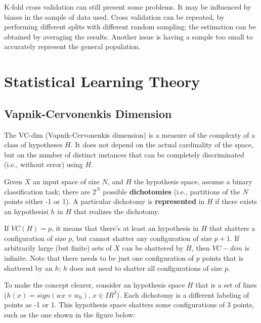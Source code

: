 K-fold cross validation can still present some problems. It may be influenced by biases in the sample of data used. Cross validation can be repeated, by performing different splits with different random sampling; the estimation can be obtained by averaging the results. Another issue is having a sample too small to accurately represent the general population.

\section{Statistical Learning Theory}

\subsection{Vapnik-Cervonenkis Dimension}

The VC-dim (Vapnik-Cervonenkis dimension) is a measure of the complexty of a class of hypotheses $H$. It does not depend on the actual cardinality of the space, but on the number of distinct instances that can be completely discriminated (i.e., without error) using $H$.

Given $X$ an input space of size $N$, and $H$ the hypothesis space, assume a binary classification task; there are $2^N$ possible \textbf{dichotomies} (i.e., partitions of the $N$ points either -1 or 1). A particular dichotomy is \textbf{represented} in $H$ if there exists an hypothesisi $h$ in $H$ that realizes the dichotomy.



If $VC(H) = p$, it means that there's at least an hypothesis in $H$ that shatters a configuration of size $p$, but cannot shatter any configuration of size $p+1$. If arbitrarily large (but finite) sets of $X$ can be shattered by $H$, then $VC-dim$ is infinite. Note that there needs to be just one configuration of $p$ points that is shattered by an $h$; $h$ does not need to shatter all configurations of size $p$.

To make the concept clearer, consider an hypothesis space $H$ that is a set of lines ($h(x) = sign(wx + w_0) , \, x \in IR^2$). Each dichotomy is a different labeling of points as -1 or 1. This hypothesis space shatters some configurations of 3 points, such as the one shown in the figure below:

